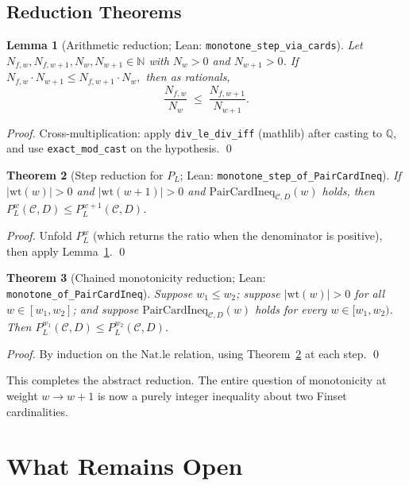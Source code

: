 \documentclass[11pt]{article}
\newtheorem{theorem}{Theorem}[section]
\newtheorem{lemma}[theorem]{Lemma}
\theoremstyle{definition}
\theoremstyle{remark}
\begin{document}
\subsection{Reduction Theorems}

\begin{lemma}[Arithmetic reduction; Lean: \texttt{monotone\_step\_via\_cards}]
\label{lem:arith-reduction}
Let $N_{f,w}, N_{f,w+1}, N_{w}, N_{w+1} \in \mathbb{N}$ with
$N_w > 0$ and $N_{w+1} > 0$.  If
$N_{f,w} \cdot N_{w+1} \leq N_{f,w+1} \cdot N_w,$
then as rationals,
$$\frac{N_{f,w}}{N_w} \;\leq\; \frac{N_{f,w+1}}{N_{w+1}}.$$
\end{lemma}
\begin{proof}
Cross-multiplication: apply \texttt{div\_le\_div\_iff} (mathlib)
after casting to $\mathbb{Q}$, and use \texttt{exact\_mod\_cast} on
the hypothesis.
\qed
\end{proof}

\begin{theorem}[Step reduction for $P_L$; Lean: \texttt{monotone\_step\_of\_PairCardIneq}]
\label{thm:step}
If $|\mathrm{wt}(w)| > 0$ and $|\mathrm{wt}(w+1)| > 0$ and
$\mathrm{PairCardIneq}_{\mathcal{C}, D}(w)$ holds, then
$P_L^{w}(\mathcal{C}, D) \leq P_L^{w+1}(\mathcal{C}, D)$.
\end{theorem}
\begin{proof}
Unfold $P_L^w$ (which returns the ratio when the denominator is
positive), then apply Lemma~\ref{lem:arith-reduction}.
\qed
\end{proof}

\begin{theorem}[Chained monotonicity reduction; Lean: \texttt{monotone\_of\_PairCardIneq}]
\label{thm:chain}
Suppose $w_1 \leq w_2$; suppose $|\mathrm{wt}(w)| > 0$ for all
$w \in [w_1, w_2]$; and suppose
$\mathrm{PairCardIneq}_{\mathcal{C}, D}(w)$ holds for every
$w \in [w_1, w_2)$.  Then
$P_L^{w_1}(\mathcal{C}, D) \leq P_L^{w_2}(\mathcal{C}, D)$.
\end{theorem}
\begin{proof}
By induction on the $\mathrm{Nat.le}$ relation, using
Theorem~\ref{thm:step} at each step.
\qed
\end{proof}

This completes the abstract reduction.  The entire question of
monotonicity at weight $w \to w+1$ is now a purely integer
inequality about two Finset cardinalities.

\section{What Remains Open}
\label{sec:monotonicity-open}
\end{document}
